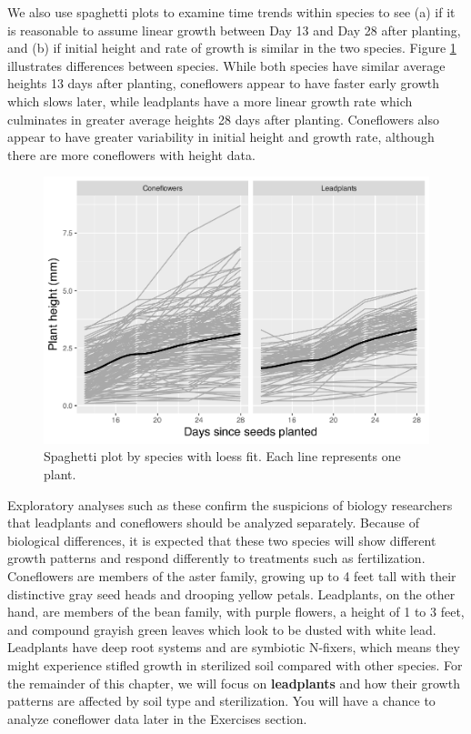 \documentclass[
]{krantz}
\begin{document}
We also use spaghetti plots to examine time trends within species to see (a) if it is reasonable to assume linear growth between Day 13 and Day 28 after planting, and (b) if initial height and rate of growth is similar in the two species. Figure \ref{fig:spagbyspec} illustrates differences between species. While both species have similar average heights 13 days after planting, coneflowers appear to have faster early growth which slows later, while leadplants have a more linear growth rate which culminates in greater average heights 28 days after planting. Coneflowers also appear to have greater variability in initial height and growth rate, although there are more coneflowers with height data.

\begin{figure}

{\centering \includegraphics[width=0.6\linewidth]{bookdown-BeyondMLR_files/figure-latex/spagbyspec-1} 

}

\caption{Spaghetti plot by species with loess fit.  Each line represents one plant.}\label{fig:spagbyspec}
\end{figure}

Exploratory analyses such as these confirm the suspicions of biology researchers that leadplants and coneflowers should be analyzed separately. Because of biological differences, it is expected that these two species will show different growth patterns and respond differently to treatments such as fertilization. Coneflowers are members of the aster family, growing up to 4 feet tall with their distinctive gray seed heads and drooping yellow petals. Leadplants, on the other hand, are members of the bean family, with purple flowers, a height of 1 to 3 feet, and compound grayish green leaves which look to be dusted with white lead. Leadplants have deep root systems and are symbiotic N-fixers, which means they might experience stifled growth in sterilized soil compared with other species. For the remainder of this chapter, we will focus on \textbf{leadplants} and how their growth patterns are affected by soil type and sterilization. You will have a chance to analyze coneflower data later in the Exercises section.
\end{document}
